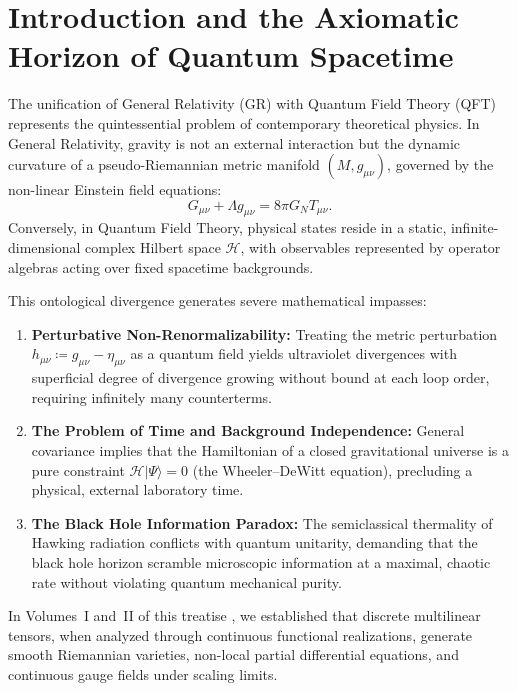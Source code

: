 \documentclass[11pt,a4paper,reqno]{amsart}
\theoremstyle{definition}
\numberwithin{equation}{section}
\begin{document}
\section{Introduction and the Axiomatic Horizon of Quantum Spacetime}
\label{sec:intro}

The unification of General Relativity (GR) with Quantum Field Theory (QFT) represents the quintessential problem of contemporary theoretical physics. In General Relativity, gravity is not an external interaction but the dynamic curvature of a pseudo-Riemannian metric manifold $(M, g_{\mu\nu})$, governed by the non-linear Einstein field equations:
\begin{equation}
    \label{eq:einstein_classical}
    G_{\mu\nu} + \Lambda g_{\mu\nu} = 8\pi G_N T_{\mu\nu}.
\end{equation}
Conversely, in Quantum Field Theory, physical states reside in a static, infinite-dimensional complex Hilbert space $\mathscr{H}$, with observables represented by operator algebras acting over fixed spacetime backgrounds.

This ontological divergence generates severe mathematical impasses:
\begin{enumerate}[label=(\roman*)]
    \item \textbf{Perturbative Non-Renormalizability:} Treating the metric perturbation $h_{\mu\nu} \coloneqq g_{\mu\nu} - \eta_{\mu\nu}$ as a quantum field yields ultraviolet divergences with superficial degree of divergence growing without bound at each loop order, requiring infinitely many counterterms.
    \item \textbf{The Problem of Time and Background Independence:} General covariance implies that the Hamiltonian of a closed gravitational universe is a pure constraint $\mathcal{H} |\Psi\rangle = 0$ (the Wheeler--DeWitt equation), precluding a physical, external laboratory time.
    \item \textbf{The Black Hole Information Paradox:} The semiclassical thermality of Hawking radiation conflicts with quantum unitarity, demanding that the black hole horizon scramble microscopic information at a maximal, chaotic rate without violating quantum mechanical purity.
\end{enumerate}

In Volumes~I and~II of this treatise \cite{silvafilho2026functional, silvafilho2026flows}, we established that discrete multilinear tensors, when analyzed through continuous functional realizations, generate smooth Riemannian varieties, non-local partial differential equations, and continuous gauge fields under scaling limits. 
\end{document}
